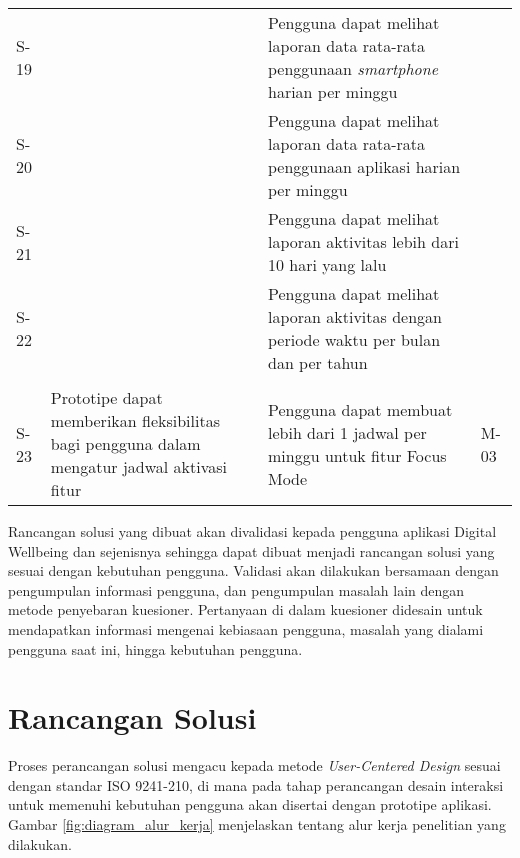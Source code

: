 \begin{longtable}[c]{|p{}|p{}|p{}|p{}|}
  S-19 &  
  & Pengguna dapat melihat laporan data rata-rata penggunaan \textit{smartphone} harian per minggu 
  & \\ \cline{1-1} \cline{3-3}

  S-20 &  
  & Pengguna dapat melihat laporan data rata-rata penggunaan aplikasi harian per minggu 
  & \\ \cline{1-1} \cline{3-3}

  S-21 &  
  & Pengguna dapat melihat laporan aktivitas lebih dari 10 hari yang lalu
  & \\ \cline{1-1} \cline{3-3}

  S-22 &  
  & Pengguna dapat melihat laporan aktivitas dengan periode waktu per bulan dan per tahun 
  & \\ \cline{1-1} \cline{3-3}

  & \\ \hline
  S-23
  & \multirow{2}{0.3\textwidth}{Prototipe dapat memberikan fleksibilitas bagi
  pengguna dalam mengatur jadwal aktivasi fitur}
  & Pengguna dapat membuat lebih dari 1 jadwal per minggu untuk fitur Focus Mode
  & \multirow{4}{0.1\textwidth}{M-03} \\ \cline{1-1} \cline{3-3}

  


\end{longtable}


Rancangan solusi yang dibuat akan divalidasi kepada pengguna aplikasi Digital Wellbeing dan sejenisnya sehingga dapat dibuat menjadi rancangan solusi yang sesuai dengan kebutuhan pengguna. Validasi akan dilakukan bersamaan dengan pengumpulan informasi pengguna, dan pengumpulan masalah lain dengan metode penyebaran kuesioner. Pertanyaan di dalam kuesioner didesain untuk mendapatkan informasi mengenai kebiasaan pengguna, masalah yang dialami pengguna saat ini, hingga kebutuhan pengguna.



\section{Rancangan Solusi}

Proses perancangan solusi mengacu kepada metode \textit{User-Centered Design} sesuai dengan standar ISO 9241-210, di mana pada tahap perancangan desain interaksi untuk memenuhi kebutuhan pengguna akan disertai dengan prototipe aplikasi. Gambar \ref{fig:diagram_alur_kerja} menjelaskan tentang alur kerja penelitian yang dilakukan.

